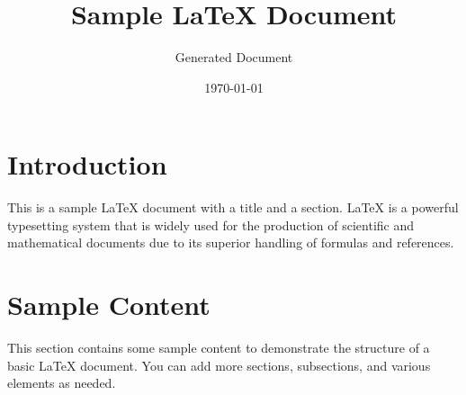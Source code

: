 \documentclass{article}
\title{Sample LaTeX Document}
\author{Generated Document}
\date{\today}
\begin{document}
\maketitle

\section{Introduction}
This is a sample LaTeX document with a title and a section. LaTeX is a powerful typesetting system that is widely used for the production of scientific and mathematical documents due to its superior handling of formulas and references.

\section{Sample Content}
This section contains some sample content to demonstrate the structure of a basic LaTeX document. You can add more sections, subsections, and various elements as needed.
\end{document}
